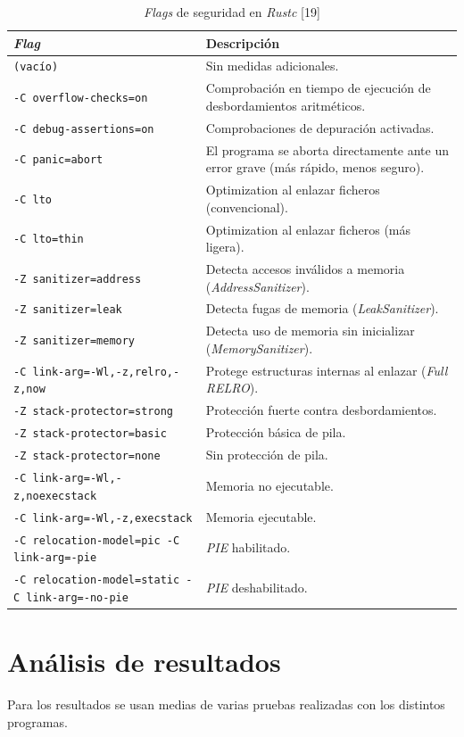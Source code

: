 \begin{table}[H]
\centering
\footnotesize
\begin{tabularx}{\linewidth}{|l|Y|}
\hline
\textbf{\emph{Flag}} & \textbf{Descripción} \\
\hline
\texttt{(vacío)} & Sin medidas adicionales. \\
\texttt{-C overflow-checks=on} & Comprobación en tiempo de ejecución de desbordamientos aritméticos. \\
\texttt{-C debug-assertions=on} & Comprobaciones de depuración activadas. \\
\texttt{-C panic=abort} & El programa se aborta directamente ante un error grave (más rápido, menos seguro). \\
\texttt{-C lto} & Optimization al enlazar ficheros (convencional). \\
\texttt{-C lto=thin} & Optimization al enlazar ficheros (más ligera). \\
\texttt{-Z sanitizer=address} & Detecta accesos inválidos a memoria (\emph{AddressSanitizer}). \\
\texttt{-Z sanitizer=leak} & Detecta fugas de memoria (\emph{LeakSanitizer}). \\
\texttt{-Z sanitizer=memory} & Detecta uso de memoria sin inicializar (\emph{MemorySanitizer}). \\
\texttt{-C link-arg=-Wl,-z,relro,-z,now} & Protege estructuras internas al enlazar (\emph{Full RELRO}). \\
\texttt{-Z stack-protector=strong} & Protección fuerte contra desbordamientos. \\
\texttt{-Z stack-protector=basic} & Protección básica de pila. \\
\texttt{-Z stack-protector=none} & Sin protección de pila. \\
\texttt{-C link-arg=-Wl,-z,noexecstack} & Memoria no ejecutable. \\
\texttt{-C link-arg=-Wl,-z,execstack} & Memoria ejecutable. \\
\texttt{-C relocation-model=pic -C link-arg=-pie} & \emph{PIE} habilitado. \\
\texttt{-C relocation-model=static -C link-arg=-no-pie} & \emph{PIE} deshabilitado. \\
\hline
\end{tabularx}
\caption{\emph{Flags} de seguridad en \emph{Rustc} [19]}
\label{tab:rust_seguridad}
\end{table}

\section{Análisis de resultados}
Para los resultados se usan medias de varias pruebas realizadas con los distintos programas.

